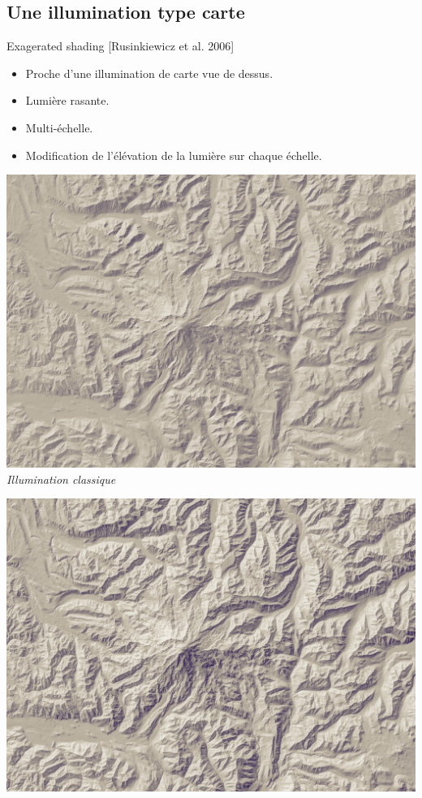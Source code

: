 \documentclass{beamer}
\begin{document}
\subsection*{Une illumination type carte}
\begin{frame}{Exagerated shading [Rusinkiewicz et al. 2006]}
\begin{itemize}
\item Proche d'une illumination de carte vue de dessus.
\item Lumière rasante.
\item Multi-échelle.
\item Modification de l'élévation de la lumière sur chaque échelle.
\end{itemize}	
\begin{center}
    \begin{minipage}[c]{0.45\linewidth}
    \begin{center}
    	\includegraphics[width=1.0\linewidth]{Etat_de_lart/terrain_diffuse.jpg}\\
    	\textit{Illumination classique}
    \end{center}
    \end{minipage}
    \begin{minipage}[c]{0.45\linewidth}
    \begin{center}
    	\includegraphics[width=1.0\linewidth]{Etat_de_lart/terrain_exag.jpg}\\

\end{center}
\end{minipage}
\end{center}
\end{frame}
\end{document}
